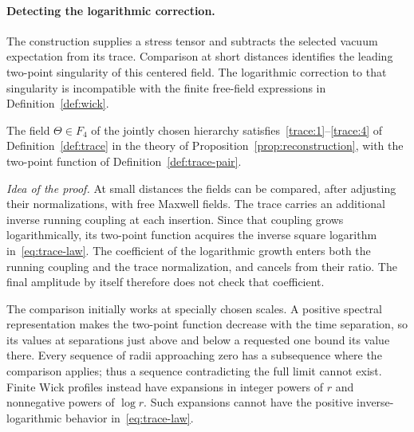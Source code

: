 
\paragraph{Detecting the logarithmic correction.}
The construction supplies a stress tensor and subtracts the selected vacuum expectation from its trace.
Comparison at short distances identifies the leading two-point singularity of this centered field.
The logarithmic correction to that singularity is incompatible with the finite free-field expressions in Definition~\ref{def:wick}.

\begin{proposition}\label{prop:trace}
The field $\Theta\in F_4$ of the jointly chosen hierarchy satisfies~\ref{trace:1}--\ref{trace:4} of Definition~\ref{def:trace} in the theory of Proposition~\ref{prop:reconstruction}, with the two-point function of Definition~\ref{def:trace-pair}.
\end{proposition}

\emph{Idea of the proof.}
At small distances the fields can be compared, after adjusting their normalizations, with free Maxwell fields.
The trace carries an additional inverse running coupling at each insertion.
Since that coupling grows logarithmically, its two-point function acquires the inverse square logarithm in~\eqref{eq:trace-law}.
The coefficient of the logarithmic growth enters both the running coupling and the trace normalization, and cancels from their ratio.
The final amplitude by itself therefore does not check that coefficient.

The comparison initially works at specially chosen scales.
A positive spectral representation makes the two-point function decrease with the time separation, so its values at separations just above and below a requested one bound its value there.
Every sequence of radii approaching zero has a subsequence where the comparison applies; thus a sequence contradicting the full limit cannot exist.
Finite Wick profiles instead have expansions in integer powers of $r$ and nonnegative powers of $\log r$.
Such expansions cannot have the positive inverse-logarithmic behavior in~\eqref{eq:trace-law}.

